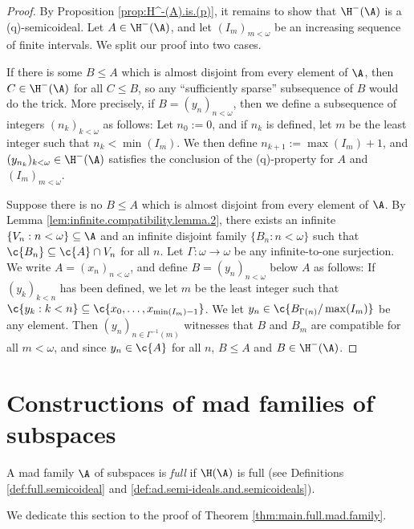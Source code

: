 \documentclass[11pt,reqno]{amsart}
\begin{document}
\begin{proof}
    By Proposition \ref{prop:H^-(A).is.(p)}, it remains to show that $\H^-(\A)$ is a (q)-semicoideal. Let $A \in \H^-(\A)$, and let $(I_m)_{m<\omega}$ be an increasing sequence of finite intervals. We split our proof into two cases.

    If there is some $B \leq A$ which is almost disjoint from every element of $\A$, then $C \in \H^-(\A)$ for all $C \leq B$, so any ``sufficiently sparse'' subsequence of $B$ would do the trick. More precisely, if $B = (y_n)_{n<\omega}$, then we define a subsequence of integers $(n_k)_{k<\omega}$ as follows: Let $n_0 := 0$, and if $n_k$ is defined, let $m$ be the least integer such that $n_k < \min(I_m)$. We then define $n_{k+1} := \max(I_m) + 1$, and $(y_{n_k})_{k<\omega} \in \H^-(\A)$ satisfies the conclusion of the (q)-property for $A$ and $(I_m)_{m<\omega}$.

    Suppose there is no $B \leq A$ which is almost disjoint from every element of $\A$. By Lemma \ref{lem:infinite.compatibility.lemma.2}, there exists an infinite $\{V_n : n < \omega\} \subseteq \A$ and an infinite disjoint family $\{B_n : n < \omega\}$ such that $\c{B_n} \subseteq \c{A} \cap V_n$ for all $n$. Let $\Gamma : \omega \to \omega$ be any infinite-to-one surjection. We write $A = (x_n)_{n<\omega}$, and define $B = (y_n)_{n<\omega}$ below $A$ as follows: If $(y_k)_{k<n}$ has been defined, we let $m$ be the least integer such that $\c{y_k : k < n} \subseteq \c{x_0,\dots,x_{\min(I_m)-1}}$. We let $y_n \in \c{B_{\Gamma(n)}/\max(I_m)}$ be any element. Then $(y_n)_{n \in \Gamma^{-1}(m)}$ witnesses that $B$ and $B_m$ are compatible for all $m < \omega$, and since $y_n \in \c{A}$ for all $n$, $B \leq A$ and $B \in \H^-(\A)$.
\end{proof}

\section{Constructions of mad families of subspaces}
\label{sec:full.mad.families}
\begin{definition}
\label{def:full.mad.family}
    A mad family $\A$ of subspaces is \emph{full} if $\H(\A)$ is full (see Definitions \ref{def:full.semicoideal} and \ref{def:ad.semi-ideals.and.semicoideals}).
\end{definition}

We dedicate this section to the proof of Theorem \ref{thm:main.full.mad.family}.
\end{document}
